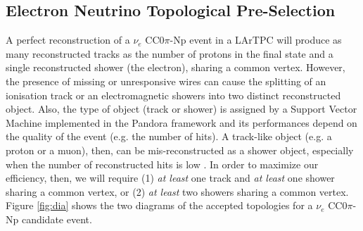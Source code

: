 \subsection{Electron Neutrino Topological Pre-Selection}
A perfect reconstruction of a $\nu_{e}$ CC0$\pi$-Np event in a LArTPC will produce as many reconstructed tracks as the number of protons in the final state and a single reconstructed shower (the electron), sharing a common vertex. However, the presence of missing or unresponsive wires can cause the splitting of an ionisation track or an electromagnetic showers into two distinct reconstructed object. Also, the type of object (track or shower) is assigned by a Support Vector Machine implemented in the Pandora framework and its performances depend on the quality of the event (e.g. the number of hits). A track-like object (e.g. a proton or a muon), then, can be mis-reconstructed as a shower object, especially when the number of reconstructed hits is low \cite{pandora2}. In order to maximize our efficiency, then, we will require (1) \emph{at least} one track and \emph{at least} one shower sharing a common vertex, or (2) \emph{at least} two showers sharing a common vertex. Figure \ref{fig:dia} shows the two diagrams of the accepted topologies for a $\nu_{e}$ CC0$\pi$-Np candidate event.

